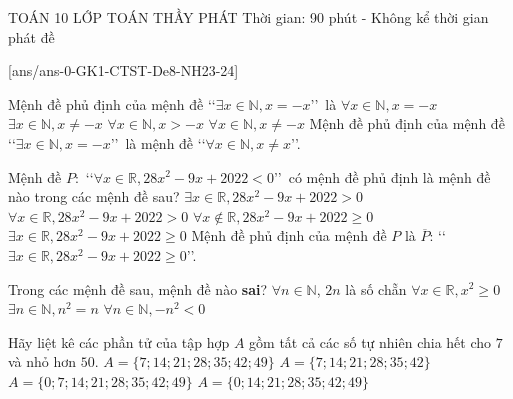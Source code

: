 \begin{name}
	{\tenchude}
	{TOÁN 10}
	{LỚP TOÁN THẦY PHÁT}
	{Thời gian: 90 phút - Không kể thời gian phát đề}
\end{name}
[ans/ans-0-GK1-CTST-De8-NH23-24]

\begin{ex}%
	Mệnh đề phủ định của mệnh đề \lq\lq $\exists x\in \mathbb{N}, x=-x$\rq\rq \, là 
	\choice
	{$\forall x\in \mathbb{N}, x=-x$}
	{$\exists x\in \mathbb{N}, x\ne -x$}
	{$\forall x\in \mathbb{N}, x>-x$}
	{\True $\forall x\in \mathbb{N}, x\ne -x$}
	\loigiai
	{
	Mệnh đề phủ định của mệnh đề \lq\lq $\exists x\in \mathbb{N}, x=-x$\rq\rq \, là mệnh đề \lq\lq $\forall x\in \mathbb{N}, x\ne x$\rq\rq.	
	}
\end{ex}

\begin{ex}%
	Mệnh đề $P\colon$ \lq\lq $\forall x\in \mathbb{R}, 28x^2-9x+2022<0$\rq\rq\, có mệnh đề phủ định là mệnh đề nào trong các mệnh đề sau?
	\choice
	{$\exists x\in \mathbb{R}, 28x^2-9x+2022>0$}
	{$\forall x\in \mathbb{R}, 28x^2-9x+2022>0$}
	{$\forall x\notin \mathbb{R}, 28x^2-9x+2022\ge 0$}
	{\True $\exists x\in \mathbb{R}, 28x^2-9x+2022\ge 0$}
	\loigiai
	{
	Mệnh đề phủ định của mệnh đề $P$ là $\overline{P}$: \lq\lq $\exists x\in \mathbb{R}, 28x^2-9x+2022\ge 0$\rq\rq.	
	}
\end{ex}

\begin{ex}%
Trong các mệnh đề sau, mệnh đề nào {\bf sai}?
\choice
{$\forall n\in \mathbb{N}$, $2n$ là số chẵn}
{$\forall x\in \mathbb{R}, x^2\ge 0$}
{$\exists n\in \mathbb{N}, n^2=n$}
{\True $\forall n\in \mathbb{N}, -n^2<0$}
\end{ex}

\begin{ex}%
Hãy liệt kê các phần tử của tập hợp $A$ gồm tất cả các số tự nhiên chia hết cho $7$ và nhỏ hơn $50$.
\choice
{$A=\{ 7; 14; 21; 28; 35; 42; 49  \}$}
{$A=\{ 7; 14; 21; 28; 35; 42 \}$}
{\True $A=\{0; 7; 14; 21; 28; 35; 42; 49  \}$}
{$A=\{  0; 14; 21; 28; 35; 42; 49\}$}
\end{ex}

